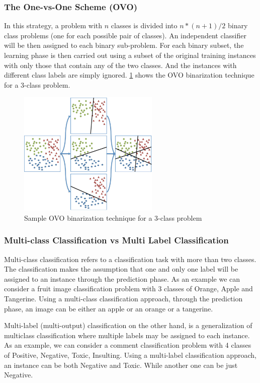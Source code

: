 \subsubsection{The One-vs-One Scheme (OVO)}
In this strategy, a problem with $n$ classes is divided into $n*(n+1)/2$  binary class 
problems (one for each possible pair of classes). An independent classifier will be then 
assigned to each binary sub-problem. For each binary subset, the learning phase is then 
carried out using a subset of the original training instances with only those that contain 
any of the two classes. And the instances with different class labels are simply ignored. 
\ref{fig:ovo} shows the OVO binarization technique for a 3-class problem.

\begin{figure}[ht]
    \centering
    \includegraphics[width=0.60\textwidth]{figures/12ovo.png}
    \caption{Sample OVO binarization technique for a 3-class problem \cite{fernandez_learning_2018}}
    \label{fig:ovo}
\end{figure}

\subsubsection{Multi-class Classification vs Multi Label Classification}
Multi-class classification refers to a classification task with more than two classes. The 
classification makes the assumption that one and only one label will be assigned to an instance  
through the prediction phase. As an example we can consider a fruit image classification problem 
with 3 classes of Orange, Apple and Tangerine. Using a multi-class classification approach, 
through the prediction phase, an image can be either an apple or an orange or a tangerine.
 
Multi-label (multi-output) classification on the other hand, is a generalization of multiclass 
classification where multiple labels may be assigned to each instance. As an example, we can 
consider a comment classification problem with 4 classes of Positive, Negative, Toxic, Insulting. 
Using a multi-label classification approach, an instance can be both Negative and Toxic. 
While another one can be just Negative.

